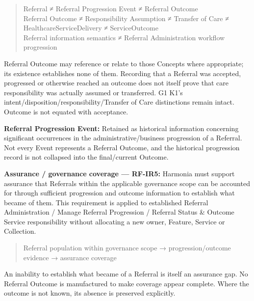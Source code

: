 \begin{quote}\small\ttfamily
Referral ≠ Referral Progression Event ≠ Referral Outcome\\
Referral Outcome ≠ Responsibility Assumption ≠ Transfer of Care ≠ HealthcareServiceDelivery ≠ ServiceOutcome\\
Referral information semantics ≠ Referral Administration workflow progression\\

\end{quote}


Referral Outcome may reference or relate to those Concepts where appropriate; its existence establishes none of them. Recording that a Referral was accepted, progressed or otherwise reached an outcome does not itself prove that care responsibility was actually assumed or transferred. G1 K1's intent/disposition/responsibility/Transfer of Care distinctions remain intact. Outcome is not equated with acceptance.



\textbf{Referral Progression Event:} Retained as historical information concerning significant occurrences in the administrative/business progression of a Referral. Not every Event represents a Referral Outcome, and the historical progression record is not collapsed into the final/current Outcome.



\textbf{Assurance / governance coverage — RF-IR5:} Harmonia must support assurance that Referrals within the applicable governance scope can be accounted for through sufficient progression and outcome information to establish what became of them. This requirement is applied to established Referral Administration / Manage Referral Progression / Referral Status \& Outcome Service responsibility without allocating a new owner, Feature, Service or Collection.



\begin{quote}\small\ttfamily
Referral population within governance scope → progression/outcome evidence → assurance coverage\\

\end{quote}


An inability to establish what became of a Referral is itself an assurance gap. No Referral Outcome is manufactured to make coverage appear complete. Where the outcome is not known, its absence is preserved explicitly.




